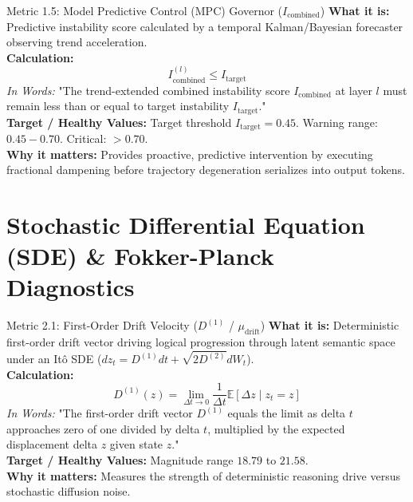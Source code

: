 \documentclass[10pt,a4paper]{article}
\begin{document}
\begin{metricbox}{Metric 1.5: Model Predictive Control (MPC) Governor ($I_{\text{combined}}$)}
\textbf{What it is:} Predictive instability score calculated by a temporal Kalman/Bayesian forecaster observing trend acceleration.\\
\textbf{Calculation:}
$$I_{\text{combined}}^{(l)} \le I_{\text{target}}$$
\emph{In Words:} "The trend-extended combined instability score $I_{\text{combined}}$ at layer $l$ must remain less than or equal to target instability $I_{\text{target}}$."\\
\textbf{Target / Healthy Values:} Target threshold $I_{\text{target}} = 0.45$. Warning range: $0.45 - 0.70$. Critical: $> 0.70$.\\
\textbf{Why it matters:} Provides proactive, predictive intervention by executing fractional dampening before trajectory degeneration serializes into output tokens.
\end{metricbox}

\section{Stochastic Differential Equation (SDE) \& Fokker-Planck Diagnostics}

\begin{metricbox}{Metric 2.1: First-Order Drift Velocity ($D^{(1)}$ / $\mu_{\text{drift}}$)}
\textbf{What it is:} Deterministic first-order drift vector driving logical progression through latent semantic space under an It\^o SDE ($dz_t = D^{(1)} dt + \sqrt{2D^{(2)}} dW_t$).\\
\textbf{Calculation:}
$$D^{(1)}(z) = \lim_{\Delta t \to 0} \frac{1}{\Delta t} \mathbb{E}\left[\Delta z \mid z_t = z\right]$$
\emph{In Words:} "The first-order drift vector $D^{(1)}$ equals the limit as delta $t$ approaches zero of one divided by delta $t$, multiplied by the expected displacement delta $z$ given state $z$."\\
\textbf{Target / Healthy Values:} Magnitude range $18.79$ to $21.58$.\\
\textbf{Why it matters:} Measures the strength of deterministic reasoning drive versus stochastic diffusion noise.
\end{metricbox}
\end{document}
